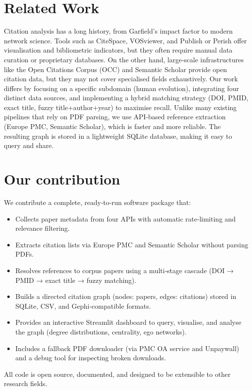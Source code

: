 \section{Related Work}
Citation analysis has a long history, from Garfield’s impact factor to modern network science. Tools such as CiteSpace, VOSviewer, and Publish or Perish offer visualisation and bibliometric indicators, but they often require manual data curation or proprietary databases. On the other hand, large‑scale infrastructures like the Open Citations Corpus (OCC) and Semantic Scholar provide open citation data, but they may not cover specialised fields exhaustively. Our work differs by focusing on a specific subdomain (human evolution), integrating four distinct data sources, and implementing a hybrid matching strategy (DOI, PMID, exact title, fuzzy title+author+year) to maximise recall. Unlike many existing pipelines that rely on PDF parsing, we use API‑based reference extraction (Europe PMC, Semantic Scholar), which is faster and more reliable. The resulting graph is stored in a lightweight SQLite database, making it easy to query and share.

\section{Our contribution}
We contribute a complete, ready‑to‑run software package that:
\begin{itemize}
    \item Collects paper metadata from four APIs with automatic rate‑limiting and relevance filtering.
    \item Extracts citation lists via Europe PMC and Semantic Scholar without parsing PDFs.
    \item Resolves references to corpus papers using a multi‑stage cascade (DOI → PMID → exact title → fuzzy matching).
    \item Builds a directed citation graph (nodes: papers, edges: citations) stored in SQLite, CSV, and Gephi‑compatible formats.
    \item Provides an interactive Streamlit dashboard to query, visualise, and analyse the graph (degree distributions, centrality, ego networks).
    \item Includes a fallback PDF downloader (via PMC OA service and Unpaywall) and a debug tool for inspecting broken downloads.
\end{itemize}
All code is open source, documented, and designed to be extensible to other research fields.

